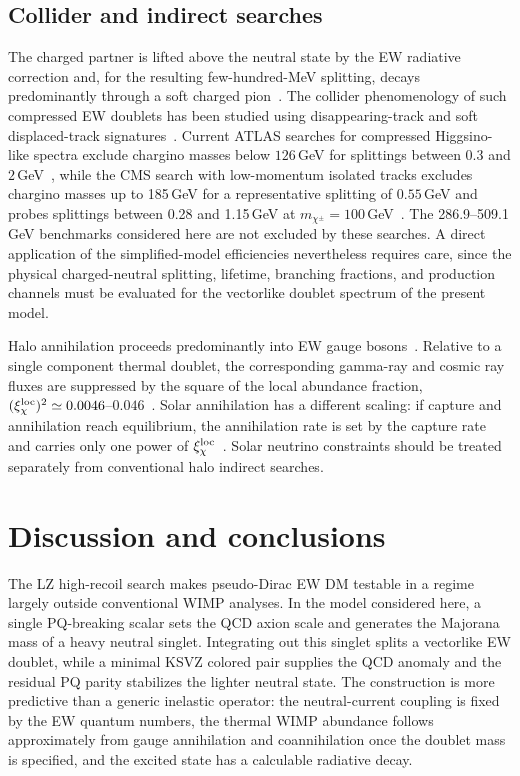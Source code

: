 \documentclass[aps,prd,reprint,preprintnumbers,superscriptaddress,nofootinbib,floatfix]{revtex4-2}
\begin{document}
\subsection{Collider and indirect searches}

The charged partner is lifted above the neutral state by the EW radiative correction and, for the resulting few-hundred-MeV splitting, decays predominantly through a soft charged pion~\cite{Thomas:1998wy, Ibe:2023dcu}. The collider phenomenology of such compressed EW doublets has been studied using disappearing-track and soft displaced-track signatures~\cite{Mahbubani:2017gjh, Fukuda:2017jmk, Fukuda:2019kbp}. Current ATLAS searches for compressed Higgsino-like spectra exclude chargino masses below $126$\,GeV for splittings between $0.3$ and $2$\,GeV~\cite{ATLAS:2025lhc}, while the CMS search with low-momentum isolated tracks excludes chargino masses up to 185\,GeV for a representative splitting of $0.55$\,GeV and probes splittings between 0.28 and 1.15\,GeV at $m_{\chi^\pm}=100$\,GeV~\cite{CMS:2026ias}. The 286.9--509.1\,GeV benchmarks considered here are not excluded by these searches. A direct application of the simplified-model efficiencies nevertheless requires care, since the physical charged-neutral splitting, lifetime, branching fractions, and production channels must be evaluated for the vectorlike doublet spectrum of the present model.

Halo annihilation proceeds predominantly into EW gauge bosons~\cite{Bertone:2004pz, Hooper:2007qk, Cirelli:2005uq, Nagata:2014wma}. Relative to a single component thermal doublet, the corresponding gamma-ray and cosmic ray fluxes are suppressed by the square of the local abundance fraction, $(\xi_\chi^{\rm loc})^2\simeq0.0046$--$0.046$~\cite{Baum:2016oow}. Solar annihilation has a different scaling: if capture and annihilation reach equilibrium, the annihilation rate is set by the capture rate and carries only one power of $\xi_\chi^{\rm loc}$~\cite{Baum:2016oow, Catena:2018vzc}. Solar neutrino constraints should be treated separately from conventional halo indirect searches.

\section{Discussion and conclusions}
\label{sec:conclusions}

The LZ high-recoil search makes pseudo-Dirac EW DM testable in a regime largely outside conventional WIMP analyses. In the model considered here, a single PQ-breaking scalar sets the QCD axion scale and generates the Majorana mass of a heavy neutral singlet. Integrating out this singlet splits a vectorlike EW doublet, while a minimal KSVZ colored pair supplies the QCD anomaly and the residual PQ parity stabilizes the lighter neutral state. The construction is more predictive than a generic inelastic operator: the neutral-current coupling is fixed by the EW quantum numbers, the thermal WIMP abundance follows approximately from gauge annihilation and coannihilation once the doublet mass is specified, and the excited state has a calculable radiative decay.
\end{document}
